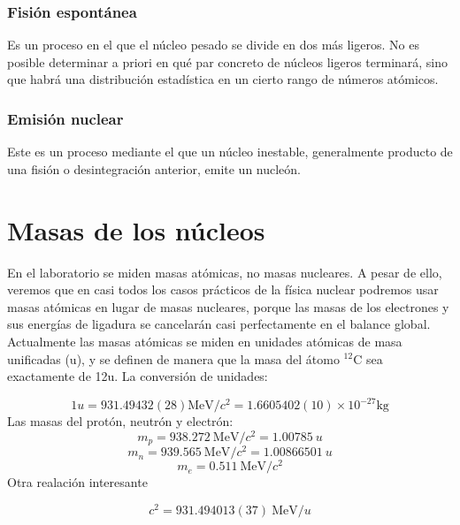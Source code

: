 \subsubsection{Fisión espontánea}

Es un proceso  en el que el núcleo pesado se divide en dos más ligeros. No es posible determinar a priori en qué par concreto de núcleos ligeros terminará, sino que habrá una distribución estadística en un cierto rango de números atómicos.

\subsubsection{Emisión nuclear}

Este es un proceso mediante el que un núcleo inestable, generalmente producto de una fisión o desintegración anterior, emite un nucleón.

\section{Masas de los núcleos}

En el laboratorio se miden masas atómicas, no masas nucleares. A pesar de ello, veremos que en casi todos los casos prácticos de la física nuclear podremos usar masas atómicas en lugar de masas nucleares, porque las masas de los electrones y sus energías de ligadura se cancelarán casi perfectamente en el balance global. Actualmente las masas atómicas se miden en unidades atómicas de masa unificadas (u), y se definen de manera que la masa del átomo $^{12}$C sea exactamente de 12u. La conversión de unidades:

\begin{equation}
	1u = 931.49432(28) \unit{\MeV/c^2} = 1.6605402(10) \times 10^{-27} \unit{\kg}
\end{equation}
Las masas del protón, neutrón y electrón:
\begin{equation}
	m_p = 938.272  \ \unit{\MeV/c^2} = 1.00785 \ u
\end{equation} 
\begin{equation}
	m_n = 939.565 \ \unit{\MeV/c^2} = 1.00866501 \ u 
\end{equation}
\begin{equation}
	m_e = 0.511 \ \unit{\MeV/c^2}
\end{equation}
Otra realación interesante

\begin{equation}
	c^2 = 931.494013(37)\ \unit{\MeV/u}
\end{equation}

